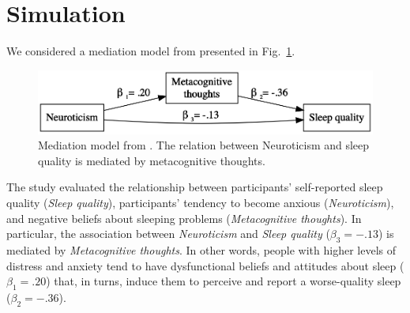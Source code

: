 \documentclass[graybox]{svmult}
\begin{document}
\section{Simulation}
\label{sec:simulation}

We considered a mediation model from \cite{sellaPersonalityTraitsSleep2020}  presented in Fig.~\ref{fig:example_model}.
\begin{figure}[t]
	\sidecaption
	\includegraphics[width = .64\textwidth]{figure/Plot_example_model}
	\caption{Mediation model from \cite{sellaPersonalityTraitsSleep2020}. The relation between Neuroticism and sleep quality is mediated by metacognitive thoughts.}
	\label{fig:example_model}
\end{figure}
The study evaluated the relationship between participants' self-reported sleep quality (\emph{Sleep quality}), participants' tendency to become anxious (\emph{Neuroticism}), and negative beliefs about sleeping problems (\emph{Metacognitive thoughts}). In particular, the association between \emph{Neuroticism} and \emph{Sleep quality} ($\beta_3=-.13$) is mediated by \emph{Metacognitive thoughts}. In other words, people with higher levels of distress and anxiety tend to have dysfunctional beliefs and attitudes about sleep ($\beta_1=.20$) that, in turns, induce them to perceive and report a worse-quality sleep ($\beta_2=-.36$).
\end{document}
